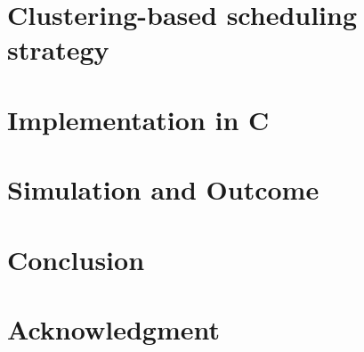 \documentclass[conference]{IEEEtran}
\begin{document}





\section{Clustering-based scheduling strategy}
\label{sec: clustering-based scheduling}

\section{Implementation in C}
\label{sec:implementation}

\section{Simulation and Outcome}
\label{sec: simulation and outcome}



\section{Conclusion}
\label{sec: conclusion}


\section*{Acknowledgment}
\end{document}
